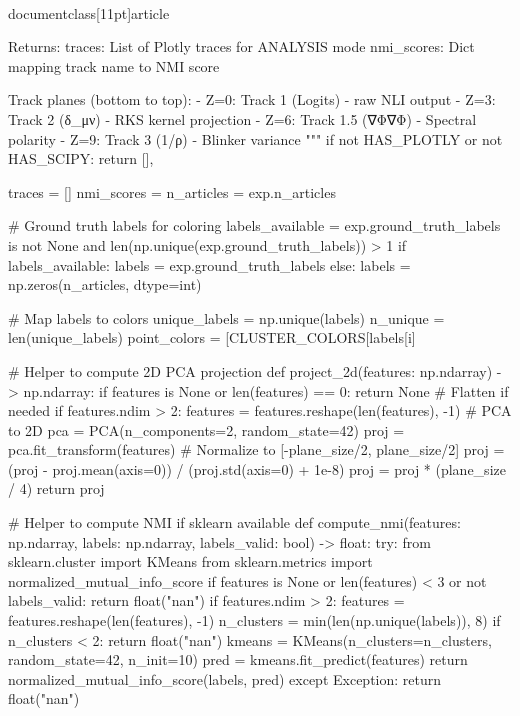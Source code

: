 \\documentclass[11pt]{article}
\begin{document}
\begin{CodeBlock}
{{{    Returns:
        traces: List of Plotly traces for ANALYSIS mode
        nmi_scores: Dict mapping track name to NMI score

    Track planes (bottom to top):
        - Z=0: Track 1 (Logits) - raw NLI output
        - Z=3: Track 2 (δ_μν) - RKS kernel projection
        - Z=6: Track 1.5 (∇Φ∇Φ) - Spectral polarity
        - Z=9: Track 3 (1/ρ) - Blinker variance
    """
    if not HAS_PLOTLY or not HAS_SCIPY:
        return [], {}

    traces = []
    nmi_scores = {}
    n_articles = exp.n_articles

    # Ground truth labels for coloring
    labels_available = exp.ground_truth_labels is not None and len(np.unique(exp.ground_truth_labels)) > 1
    if labels_available:
        labels = exp.ground_truth_labels
    else:
        labels = np.zeros(n_articles, dtype=int)

    # Map labels to colors
    unique_labels = np.unique(labels)
    n_unique = len(unique_labels)
    point_colors = [CLUSTER_COLORS[labels[i] %

    # Helper to compute 2D PCA projection
    def project_2d(features: np.ndarray) -> np.ndarray:
        if features is None or len(features) == 0:
            return None
        # Flatten if needed
        if features.ndim > 2:
            features = features.reshape(len(features), -1)
        # PCA to 2D
        pca = PCA(n_components=2, random_state=42)
        proj = pca.fit_transform(features)
        # Normalize to [-plane_size/2, plane_size/2]
        proj = (proj - proj.mean(axis=0)) / (proj.std(axis=0) + 1e-8)
        proj = proj * (plane_size / 4)
        return proj

    # Helper to compute NMI if sklearn available
    def compute_nmi(features: np.ndarray, labels: np.ndarray, labels_valid: bool) -> float:
        try:
            from sklearn.cluster import KMeans
            from sklearn.metrics import normalized_mutual_info_score
            if features is None or len(features) < 3 or not labels_valid:
                return float("nan")
            if features.ndim > 2:
                features = features.reshape(len(features), -1)
            n_clusters = min(len(np.unique(labels)), 8)
            if n_clusters < 2:
                return float("nan")
            kmeans = KMeans(n_clusters=n_clusters, random_state=42, n_init=10)
            pred = kmeans.fit_predict(features)
            return normalized_mutual_info_score(labels, pred)
        except Exception:
            return float("nan")

}}}
\end{CodeBlock}
\end{document}
